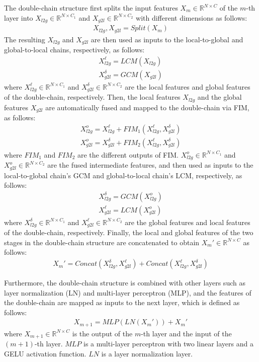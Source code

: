\documentclass[journal]{IEEEtran}
\begin{document}
The double-chain structure first splits the input features $X_m \in \mathbb{R}^{N \times C}$ of the $m$-th layer into $X_{l2g}\in \mathbb{R}^{N \times C_1}$ and $X_{g2l}\in \mathbb{R}^{N \times C_2}$ with different dimensions as follows:
\begin{gather}
\label{eq:split}
X_{l2g},X_{g2l} = Split(X_m)
\end{gather}
The resulting $X_{l2g}$ and $X_{g2l}$ are then used as inputs to the local-to-global and global-to-local chains, respectively, as follows:
\begin{gather}
\label{eq:doublechain1}
X_{l2g}^\ell=LCM(X_{l2g})  \\
X_{g2l}^\delta=GCM(X_{g2l})
\end{gather}
where $X_{l2g}^\ell \in \mathbb{R}^{N \times C_1}$  and $X_{g2l}^\delta \in \mathbb{R}^{N \times C_2}$ are the local features and global features of the double-chain, respectively. Then, the local features $X_{l2g}$ and the global features $X_{g2l}$ are automatically fused and mapped to the double-chain via FIM, as follows:
\begin{gather}
\label{eq:doublechain2}
X_{l2g}^o=X_{l2g}^\ell + FIM_1(X_{l2g}^\ell,X_{g2l}^\delta)\\
X_{g2l}^o=X_{g2l}^\delta + FIM_2(X_{l2g}^\ell,X_{g2l}^\delta)
\end{gather}
where $FIM_1$ and $FIM_2$ are the different outputs of FIM. $X_{l2g}^o \in \mathbb{R}^{N \times C_1}$  and $X_{g2l}^o \in \mathbb{R}^{N \times C_2}$ are the fused intermediate features, and then used as inputs to the local-to-global chain's GCM and global-to-local chain's LCM, respectively, as follows:
\begin{gather}
\label{eq:doublechain3}
X_{l2g}^\delta = GCM(X_{l2g}^o)\\
X_{g2l}^\ell = LCM(X_{g2l}^o)
\end{gather}
where $X_{l2g}^\delta \in \mathbb{R}^{N \times C_1}$  and $X_{g2l}^\ell \in \mathbb{R}^{N \times C_2}$ are the global features and local features of the double-chain, respectively. Finally, the local and global features of the two stages in the double-chain structure are concatenated to obtain $X_{m}'\in \mathbb{R}^{N \times C}$ as follows:
\begin{gather}
\label{eq:concat}
X_m' = Concat(X_{l2g}^\delta,X_{g2l}^\ell) + Concat(X_{l2g}^\ell,X_{g2l}^\delta)
\end{gather}



Furthermore, the double-chain structure is combined with other layers such as layer normalization (LN) and multi-layer perceptron (MLP), and the features of the double-chain are mapped as inputs to the next layer, which is defined as follows:
\begin{gather}
\label{eq:mlp}
X_{m+1} = MLP(LN(X_m')) + X_m'
\end{gather}
where $X_{m+1} \in \mathbb{R}^{N \times C}$ is the output of the $m$-th layer and the input of the $(m+1)$-th layer. $MLP$ is a multi-layer perceptron with two linear layers and a GELU activation function. $LN$ is a layer normalization layer.
\end{document}
